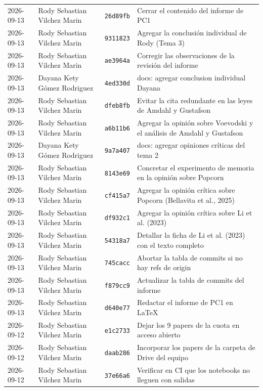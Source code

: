 {\begin{xltabular}{\textwidth}{@{}L{2cm}L{2.9cm}L{1.5cm}Y@{}}
2026-09-13 & Rody Sebastian Vilchez Marin & \texttt{26d89fb} & Cerrar el contenido del informe de PC1 \\
2026-09-13 & Rody Sebastian Vilchez Marin & \texttt{9311823} & Agregar la conclusión individual de Rody (Tema 3) \\
2026-09-13 & Rody Sebastian Vilchez Marin & \texttt{ae3964a} & Corregir las observaciones de la revisión del informe \\
2026-09-13 & Dayana Kety Gómez Rodriguez & \texttt{4ed330d} & docs: agregar conclusion individual Dayana \\
2026-09-13 & Rody Sebastian Vilchez Marin & \texttt{dfeb8fb} & Evitar la cita redundante en las leyes de Amdahl y Gustafson \\
2026-09-13 & Rody Sebastian Vilchez Marin & \texttt{a6b11b6} & Agregar la opinión sobre Voevodski y el análisis de Amdahl y Gustafson \\
2026-09-13 & Dayana Kety Gómez Rodriguez & \texttt{9a7a407} & docs: agregar opiniones críticas del tema 2 \\
2026-09-13 & Rody Sebastian Vilchez Marin & \texttt{8143e69} & Concretar el experimento de memoria en la opinión sobre Popcorn \\
2026-09-13 & Rody Sebastian Vilchez Marin & \texttt{cf415a7} & Agregar la opinión crítica sobre Popcorn (Bellavita et al., 2025) \\
2026-09-13 & Rody Sebastian Vilchez Marin & \texttt{df932c1} & Agregar la opinión crítica sobre Li et al. (2023) \\
2026-09-13 & Rody Sebastian Vilchez Marin & \texttt{54318a7} & Detallar la ficha de Li et al. (2023) con el texto completo \\
2026-09-13 & Rody Sebastian Vilchez Marin & \texttt{745cacc} & Abortar la tabla de commits si no hay refs de origin \\
2026-09-13 & Rody Sebastian Vilchez Marin & \texttt{f879cc9} & Actualizar la tabla de commits del informe \\
2026-09-13 & Rody Sebastian Vilchez Marin & \texttt{d640e77} & Redactar el informe de PC1 en LaTeX \\
2026-09-12 & Rody Sebastian Vilchez Marin & \texttt{e1c2733} & Dejar los 9 papers de la cuota en acceso abierto \\
2026-09-12 & Rody Sebastian Vilchez Marin & \texttt{daab286} & Incorporar los papers de la carpeta de Drive del equipo \\
2026-09-12 & Rody Sebastian Vilchez Marin & \texttt{37e66a6} & Verificar en CI que los notebooks no lleguen con salidas \\

\end{xltabular}}
